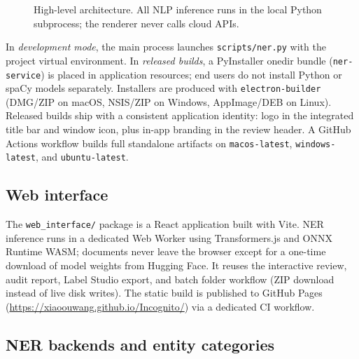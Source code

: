 \documentclass[11pt,a4paper]{article}
\begin{document}
\begin{figure}[ht]
  \centering
  \caption{High-level architecture. All NLP inference runs in the local Python
  subprocess; the renderer never calls cloud APIs.}
  \label{fig:architecture}
\end{figure}

In \emph{development mode}, the main process launches \texttt{scripts/ner.py} with the
project virtual environment.
In \emph{released builds}, a PyInstaller onedir bundle (\texttt{ner-service}) is
placed in application resources; end users do not install Python or spaCy models
separately.
Installers are produced with \texttt{electron-builder} (DMG/ZIP on macOS, NSIS/ZIP
on Windows, AppImage/DEB on Linux).
Released builds ship with a consistent application identity: logo in the integrated
title bar and window icon, plus in-app branding in the review header.
A GitHub Actions workflow builds full standalone artifacts on
\texttt{macos-latest}, \texttt{windows-latest}, and \texttt{ubuntu-latest}.

\subsection{Web interface}

The \texttt{web\_interface/} package is a React application built with Vite.
NER inference runs in a dedicated Web Worker using Transformers.js and ONNX Runtime
WASM; documents never leave the browser except for a one-time download of model
weights from Hugging Face.
It reuses the interactive review, audit report, Label Studio export, and batch
folder workflow (ZIP download instead of live disk writes).
The static build is published to GitHub Pages
(\url{https://xiaoouwang.github.io/Incognito/}) via a dedicated CI workflow.

\subsection{NER backends and entity categories}
\end{document}
